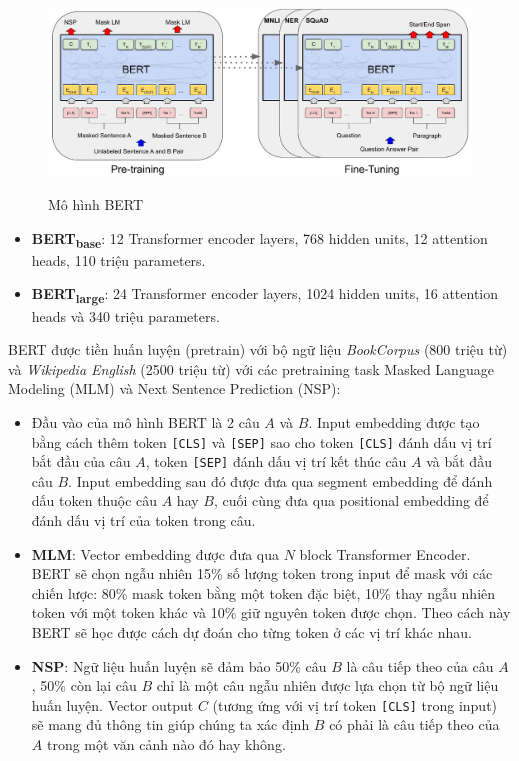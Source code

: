 \begin{figure}
\centering
\resizebox{\textwidth}{!}
{\includegraphics{img/BERT.jpg}}
\caption{Mô hình BERT\cite{devlin-etal-2019-bert}}
\label{fig:my_label}
\end{figure}
\begin{itemize}
\item \textbf{BERT\textsubscript{base}}: 12 Transformer encoder layers, 768 hidden units, 12 attention heads, 110 triệu parameters.
\item \textbf{BERT\textsubscript{large}}: 24 Transformer encoder layers, 1024 hidden units, 16 attention heads và 340 triệu parameters.
\end{itemize}
BERT được tiền huấn luyện (pretrain) với bộ ngữ liệu \textit{BookCorpus} (800 triệu từ) và \textit{Wikipedia English} (2500 triệu từ) với các pretraining task Masked Language Modeling (MLM) và Next Sentence Prediction (NSP):
\begin{itemize}
\item Đầu vào của mô hình BERT là 2 câu $A$ và $B$. Input embedding được tạo bằng cách thêm token \texttt{[CLS]} và \texttt{[SEP]} sao cho token \texttt{[CLS]} đánh dấu vị trí bắt đầu của câu $A$, token \texttt{[SEP]} đánh dấu vị trí kết thúc câu $A$ và bắt đầu câu $B$. Input embedding sau đó được đưa qua segment embedding để đánh dấu token thuộc câu $A$ hay $B$, cuối cùng đưa qua positional embedding để đánh dấu vị trí của token trong câu.

\item \textbf{MLM}: Vector embedding được đưa qua $N$ block Transformer Encoder. BERT sẽ chọn ngẫu nhiên 15\% số lượng token trong input để mask với các chiến lược: 80\% mask token bằng một token đặc biệt, 10\% thay ngẫu nhiên token với một token khác và 10\% giữ nguyên token được chọn. Theo cách này BERT sẽ học được cách dự đoán cho từng token ở các vị trí khác nhau.

\item \textbf{NSP}: Ngữ liệu huấn luyện sẽ đảm bảo 50\% câu $B$ là câu tiếp theo của câu $A$, 50\% còn lại câu $B$ chỉ là một câu ngẫu nhiên được lựa chọn từ bộ ngữ liệu huấn luyện. Vector output $C$ (tương ứng với vị trí token \texttt{[CLS]} trong input) sẽ mang đủ thông tin giúp chúng ta xác định $B$ có phải là câu tiếp theo của $A$ trong một văn cảnh nào đó hay không.
\end{itemize}

